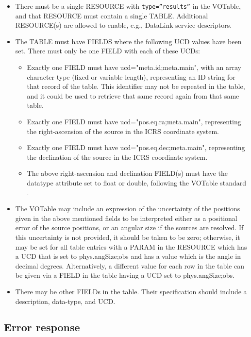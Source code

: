 \documentclass[11pt,a4paper]{ivoa}
\begin{document}
\begin{itemize}
	\item There must be a single RESOURCE with \texttt{type=''results''} in the VOTable,
		and that RESOURCE must contain a single TABLE. Additional RESOURCE(s) are
		allowed to enable, e.g., DataLink service descriptors.
	\item The TABLE must have FIELDS where
		the following UCD values have been set. There must only be one FIELD
		with each of these UCDs:

	\begin{itemize}
		\item Exactly one FIELD must have ucd="meta.id;meta.main",
	 		with an array character type (fixed or variable
			length), representing an ID string for that record of the table. This
			identifier may not be repeated in the table, and it could be used to
			retrieve that same record again from that same table.
		\item Exactly one FIELD must have ucd="pos.eq.ra;meta.main",
			representing the right-ascension of the source in the ICRS coordinate system.
		\item Exactly one FIELD must have ucd="pos.eq.dec;meta.main",
			representing the declination of the source in the ICRS coordinate system.
		\item The above right-ascension and declination FIELD(s) must have the datatype
			attribute set to float or double, following the VOTable
			standard \citep{2025ivoa.spec.0116O}.
	\end{itemize}

	\item The VOTable may include an expression of the
		uncertainty of the positions given in the above mentioned fields to be
		interpreted either as a positional error of the source positions, or an
		angular size if the sources are resolved. If this uncertainty is not
		provided, it should be taken to be zero; otherwise, it may be set for
		all table entries with a PARAM in the RESOURCE which has a UCD that is
		set to phys.angSize;obs and has a value which is the angle in decimal
		degrees. Alternatively, a different value for each row in the table can
		be given via a FIELD in the table having a UCD set to phys.angSize;obs.
	\item There may be other FIELDs in the table. Their specification should
		include a description, data-type, and UCD.
\end{itemize}
	
\subsection{Error response}
\label{subsec:error}
	
\end{document}
